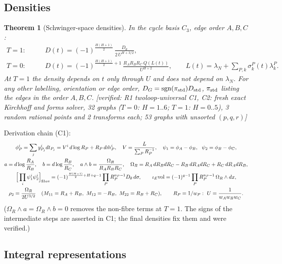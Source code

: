 \documentclass[10pt,a4paper]{article}
\numberwithin{equation}{section}
\newtheorem{theorem}{Theorem}[section]
\theoremstyle{definition}
\theoremstyle{remark}
\newcommand{\sgn}{\operatorname{sgn}}
\newcommand{\ver}[1]{\textup{[verified: #1]}}
\begin{document}
\subsection{Densities}

\begin{theorem}[Schwinger-space densities]\label{thm-dens}
In the cycle basis $C_3$, edge order $A,B,C$:
\begin{align}
T=1:&\qquad D(t)=(-1)^{\frac{H(H+1)}2}\,\frac{D_\theta}{2\,U^{H+3/2}},\\
T=0:&\qquad D(t)=(-1)^{\frac{H(H+1)}2+1}\,\frac{R_AR_BR_C\,Q(L(t))}{U^{H+2}},\qquad L(t)=\lambda_N+\sum_{P,k}\sigma^P_k(t)\lambda^P_k .
\end{align}
At $T=1$ the density depends on $t$ only through $U$ and does not depend on $\lambda_N$. For any other labelling, orientation or edge order, $D_G=\sgn(\pi_{\rm std})D_{\rm std}$, $\pi_{\rm std}$ listing the edges in the order $A,B,C$.
\ver{R1 twoloop-universal C1, C2: fresh exact Kirchhoff and forms solver, 32 graphs ($T=0$: $H=1..6$; $T=1$: $H=0..5$), 3 random rational points and 2 transforms each; 53 graphs with unsorted $(p,q,r)$}
\end{theorem}
Derivation chain (C1):
\begin{gather}
\phi^i_P=\sum_jy^i_{P_j}dt_{P_j}=V^i\,d\log R_P+R_P\,d\hat m^i_P,\quad V=\frac{L}{\sum_PR_P^{-1}},\quad \psi_1=\phi_A-\phi_B,\ \ \psi_2=\phi_B-\phi_C,\\
a=d\log\frac{R_A}{R_B},\quad b=d\log\frac{R_B}{R_C},\quad a\wedge b=\frac{\Omega_R}{R_AR_BR_C},\quad \Omega_R=R_A\,dR_BdR_C-R_B\,dR_AdR_C+R_C\,dR_AdR_B,\\
\Big[\prod_i\psi^i_1\psi^i_2\Big]_{\rm fibre}=(-1)^{\frac{H(H-1)}2+H+q-1}\prod_PR_P^{n_P-1}D_\theta\,d\sigma,\qquad
\iota_E{\rm vol}=(-1)^{q-1}\prod_PR_P^{n_P-1}\,\Omega_R\wedge dx,\\
\rho_2=\frac{\Omega_R}{2U^{3/2}}\quad(M_{11}=R_A+R_B,\ M_{12}=-R_B,\ M_{22}=R_B+R_C),\qquad R_P=1/w_P:\ U=\frac1{w_Aw_Bw_C}.
\end{gather}
($\Omega_R\wedge a=\Omega_R\wedge b=0$ removes the non-fibre terms at $T=1$. The signs of the intermediate steps are asserted in C1; the final densities fix them and were verified.)

\subsection{Integral representations}
\end{document}
